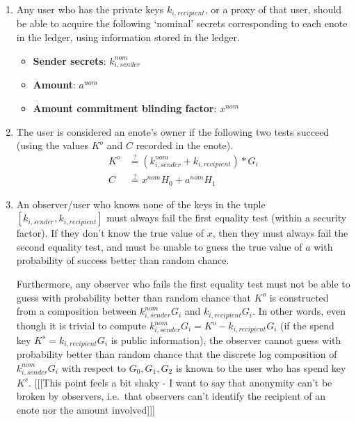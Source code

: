 \begin{enumerate}
    \item Any user who has the private keys $k_{i,recipient}$, or a proxy of that user, should be able to acquire the following `nominal' secrets corresponding to each enote in the ledger, using information stored in the ledger.

    \begin{itemize}
        \item \textbf{Sender secrets}: $k^{nom}_{i,sender}$
        \item \textbf{Amount}: $a^{nom}$
        \item \textbf{Amount commitment blinding factor}: $x^{nom}$
    \end{itemize}

    \item The user is considered an enote's owner if the following two tests succeed (using the values $K^o$ and $C$ recorded in the enote).\vspace{.115cm}
    \begin{align*}
        K^o &\stackrel{?}{=} (k^{nom}_{i,sender} + k_{i,recipient})*G_i \\
        C &\stackrel{?}{=} x^{nom} H_0 + a^{nom} H_1
    \end{align*}

    \item An observer/user who knows none of the keys in the tuple $[k_{i,sender}, k_{i,recipient}]$ must always fail the first equality test (within a security factor). If they don't know the true value of $x$, then they must always fail the second equality test, and must be unable to guess the true value of $a$ with probability of success better than random chance.

    Furthermore, any observer who fails the first equality test must not be able to guess with probability better than random chance that $K^o$ is constructed from a composition between $k^{nom}_{i,sender} G_i$ and $k_{i,recipient} G_i$. In other words, even though it is trivial to compute $k^{nom}_{i,sender} G_i = K^o - k_{i,recipient} G_i$ (if the spend key $K^s = k_{i,recipient} G_i$ is public information), the observer cannot guess with probability better than random chance that the discrete log composition of $k^{nom}_{i,sender} G_i$ with respect to $G_0, G_1, G_2$ is known to the user who has spend key $K^s$. [[[This point feels a bit shaky - I want to say that anonymity can't be broken by observers, i.e.\ that observers can't identify the recipient of an enote nor the amount involved]]]
\end{enumerate}

